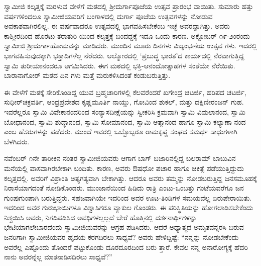 ಸ್ವಾಮೀಜಿ ಕಲ್ಕತ್ತಕ್ಕೆ ಮರಳುವ ವೇಳೆಗೆ ಮಠದಲ್ಲಿ ಶ್ರೀದುರ್ಗಾಪೂಜೆಯ ಉತ್ಸವ ಪ್ರಾರಂಭ ವಾಯಿತು. ಸುಮಾರು ಹತ್ತು ವರ್ಷಗಳಿಂದಲೂ ಸ್ವಾಮೀಜಿಯವರಿಗೆ ಬಂಗಾಳದಲ್ಲಿ ದುರ್ಗಾ ಪೂಜೆಯ ಉತ್ಸವಗಳನ್ನು ನೋಡುವ ಅವಕಾಶವಾಗಿರಲಿಲ್ಲ. ಈ ವರ್ಷವಾದರೂ ಉತ್ಸವದಲ್ಲಿ ಭಾಗವಹಿಸಬೇಕೆಂಬ ಇಚ್ಛೆ ಅವರದ್ದಾಗಿತ್ತು. ಅವರು ಕಾಶ್ಮೀರದಿಂದ ಹೊರಟು ತರಾತುರಿ ಯಿಂದ ಕಲ್ಕತ್ತಕ್ಕೆ ಬಂದದ್ದಕ್ಕೆ ಇದೂ ಒಂದು ಕಾರಣ. ಅಕ್ಟೋಬರ್ ೧೯-೨ಂರಂದು ಸ್ವಾಮೀಜಿ ಶ್ರೀದುರ್ಗಾಹೋಮವನ್ನು ಮಾಡಿದರು. ಮುಂದಿನ ಮೂರು ದಿನಗಳು ವಿಜೃಂಭಣೆಯ ಉತ್ಸವ ಗಳು. ಇದರಲ್ಲಿ ಭಾಗವಹಿಸುವುದಕ್ಕಾಗಿ ಭಕ್ತಾದಿಗಳೆಲ್ಲ ನೆರೆದರು. ಆಲ್ಮೋರದಲ್ಲಿ ‘ಪ್ರಬುದ್ಧ ಭಾರತ’ದ ಕಾರ್ಯದಲ್ಲಿ ನೆರವಾಗುತ್ತಿದ್ದ ಸ್ವಾಮಿ ತುರೀಯಾನಂದರೂ ಆಗಮಿಸಿದರು. ಈಗ ಮಠದಲ್ಲಿ ಭಕ್ತಿ-ಆನಂದೋತ್ಸಾಹಗಳ ಸಂತೆಯೇ ನೆರೆಯಿತು. ಬಾರಾನಾಗೋರ್ ಮಠದ ದಿನ ಗಳು ಮತ್ತೆ ಮರುಕಳಿಸಿದಂತೆ ಕಂಡುಬರುತ್ತಿತ್ತು.

ಈ ವೇಳೆಗೆ ಮಠಕ್ಕೆ ಸೇರಿಕೊಂಡಿದ್ದ ಯುವ ಬ್ರಹ್ಮಚಾರಿಗಳಲ್ಲಿ ಕೆಲವರೆಂದರೆ ಖಗೇಂದ್ರ ಚಟರ್ಜಿ, ಹರಿಪದ ಚಟರ್ಜಿ, ಸುಧೀರ್​ಚಕ್ರವರ್ತಿ, ಆಂಧ್ರಪ್ರದೇಶದ ಕೃಷ್ಣಮೂರ್ತಿ ನಾಯ್ಡು, ಗೋವಿಂದ ಶುಕಲ್, ಮತ್ತು ದಕ್ಷಿಣೀರಂಜನ್ ಗುಹ. ಇವರೆಲ್ಲರೂ ಸ್ವಾಮಿ ವಿವೇಕಾನಂದರಿಂದ ಸಂನ್ಯಾಸದೀಕ್ಷೆಯನ್ನು ಸ್ವೀಕರಿಸಿ ಕ್ರಮವಾಗಿ ಸ್ವಾಮಿ ವಿಮಲಾನಂದ, ಸ್ವಾಮಿ ಬೋಧಾನಂದ, ಸ್ವಾಮಿ ಶುದ್ಧಾನಂದ, ಸ್ವಾಮಿ ಸೋಮಾನಂದ, ಸ್ವಾಮಿ ಆತ್ಮಾನಂದ ಹಾಗೂ ಸ್ವಾಮಿ ಕಲ್ಯಾಣಾ ನಂದ ಎಂಬ ಹೆಸರುಗಳನ್ನು ಪಡೆದರು. ಮುಂದೆ ಇವರಲ್ಲಿ ಒಬ್ಬೊಬ್ಬರೂ ರಾಮಕೃಷ್ಣ ಸಂಘದ ಸಮರ್ಥ ಸಾಧುಗಳಾಗಿ ಬೆಳಗಿದರು.

ನವೆಂಬರ್ ೧ನೇ ತಾರೀಕಿನ ನಂತರ ಸ್ವಾಮೀಜಿಯವರು ಆಗಾಗ ಬಾಗ್ ಬಜಾರಿನಲ್ಲಿದ್ದ ಬಲರಾಮ್ ಬಾಬುವಿನ ಮನೆಯಲ್ಲಿ ವಾಸವಾಗಿರಬೇಕಾಗಿ ಬಂದಿತು. ಕಾರಣ, ಅವರು ಔಷಧೋ ಪಚಾರ ಹಾಗೂ ಚಿಕಿತ್ಸೆ ಪಡೆಯುತ್ತಿದ್ದುದು ಕಲ್ಕತ್ತದಲ್ಲಿ. ಅವರಿಗೆ ವಿಶ್ರಾಂತಿ ಅತ್ಯಗತ್ಯವಾಗಿ ಬೇಕಾಗಿತ್ತು. ಆದರೂ ಅವರು ತಮ್ಮನ್ನು ನೋಡಬರುತ್ತಿದ್ದ ಜನಸಮೂಹಕ್ಕೆ ನಿರಾಸೆಯಾಗದಂತೆ ನೋಡಿಕೊಂಡರು. ಮುಂಜಾನೆಯಿಂದ ಹಿಡಿದು ರಾತ್ರಿ ಎಂಟು-ಒಂಬತ್ತು ಗಂಟೆಯವರೆಗೂ ಜನ ಗುಂಪುಗುಂಪಾಗಿ ಬರುತ್ತಿದ್ದರು. ಸಹಜವಾಗಿಯೇ ಇದರಿಂದ ಅವರ ಊಟ-ತಿಂಡಿಗಳ ಸಮಯವೆಲ್ಲ ಏರುಪೇರಾಯಿತು. ಇದರಿಂದ ಅವರ ಗುರುಭಾಯಿಗಳೂ ವಿಶ್ವಾಸಿಗರೂ ವ್ಯಾಕುಲ ಗೊಂಡರು. ಈ ಪರಿಸ್ಥಿತಿಯನ್ನು ಹೋಗಲಾಡಿಸಬೇಕೆಂದು ನಿಶ್ಚಯಿಸಿ ಅವರು, ನಿಗದಿಪಡಿಸಿದ ಅವಧಿಗಳಲ್ಲಲ್ಲದೆ ಬೇರೆ ಹೊತ್ತಿನಲ್ಲಿ ದರ್ಶನಾರ್ಥಿಗಳನ್ನು ಭೇಟಿಯಾಗಲೇಬಾರದೆಂದು ಸ್ವಾಮೀಜಿಯವರನ್ನು ಆಗ್ರಹ ಪಡಿಸಿದರು. ಆದರೆ ಅಧ್ಯಾತ್ಮದ ಅಮೃತವನ್ನರಸಿ ಬರುವ ಜನರಿಗಾಗಿ ಸ್ವಾಮೀಜಿಯವರ ಹೃದಯ ಕರಗದಿರಲು ಸಾಧ್ಯವೆ? ಅವರು ಹೇಳಿದ್ದಿಷ್ಟೆ: “ನನ್ನನ್ನು ನೋಡಬೇಕೆಂದು ಅವರೆಲ್ಲ ಎಷ್ಟೊಂದು ತೊಂದರೆ ಪಟ್ಟುಕೊಂಡು ದೂರದೂರದಿಂದ ಬರು ತ್ತಾರೆ. ಕೇವಲ ನನ್ನ ಅನಾರೋಗ್ಯಕ್ಕೆ ಹೆದರಿ ನಾನು ಅವರನ್ನೆಲ್ಲ ಮಾತನಾಡಿಸದಿರಲು ಸಾಧ್ಯವೆ?”

